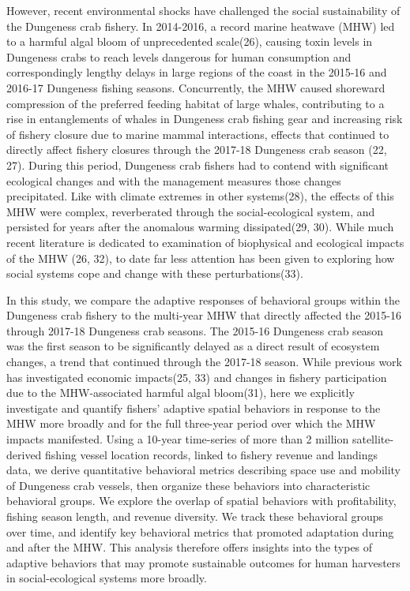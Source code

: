 \documentclass[9pt,twocolumn,twoside,lineno]{pnas-new}
\begin{document}
However, recent environmental shocks have challenged the social
sustainability of the Dungeness crab fishery. In 2014-2016, a record
marine heatwave (MHW) led to a harmful algal bloom of unprecedented
scale(26), causing toxin levels in Dungeness crabs to reach levels
dangerous for human consumption and correspondingly lengthy delays in
large regions of the coast in the 2015-16 and 2016-17 Dungeness fishing
seasons. Concurrently, the MHW caused shoreward compression of the
preferred feeding habitat of large whales, contributing to a rise in
entanglements of whales in Dungeness crab fishing gear and increasing
risk of fishery closure due to marine mammal interactions, effects that
continued to directly affect fishery closures through the 2017-18
Dungeness crab season (22, 27). During this period, Dungeness crab
fishers had to contend with significant ecological changes and with the
management measures those changes precipitated. Like with climate
extremes in other systems(28), the effects of this MHW were complex,
reverberated through the social-ecological system, and persisted for
years after the anomalous warming dissipated(29, 30). While much recent
literature is dedicated to examination of biophysical and ecological
impacts of the MHW (26, 32), to date far less attention has been given
to exploring how social systems cope and change with these
perturbations(33).

In this study, we compare the adaptive responses of behavioral groups
within the Dungeness crab fishery to the multi-year MHW that directly
affected the 2015-16 through 2017-18 Dungeness crab seasons. The 2015-16
Dungeness crab season was the first season to be significantly delayed
as a direct result of ecosystem changes, a trend that continued through
the 2017-18 season. While previous work has investigated economic
impacts(25, 33) and changes in fishery participation due to the
MHW-associated harmful algal bloom(31), here we explicitly investigate
and quantify fishers' adaptive spatial behaviors in response to the MHW
more broadly and for the full three-year period over which the MHW
impacts manifested. Using a 10-year time-series of more than 2 million
satellite-derived fishing vessel location records, linked to fishery
revenue and landings data, we derive quantitative behavioral metrics
describing space use and mobility of Dungeness crab vessels, then
organize these behaviors into characteristic behavioral groups. We
explore the overlap of spatial behaviors with profitability, fishing
season length, and revenue diversity. We track these behavioral groups
over time, and identify key behavioral metrics that promoted adaptation
during and after the MHW. This analysis therefore offers insights into
the types of adaptive behaviors that may promote sustainable outcomes
for human harvesters in social-ecological systems more broadly.
\end{document}

